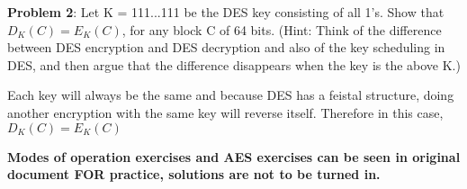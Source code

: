\documentclass[12pt,letterpaper,final]{report}
\begin{document}
\bigskip
\noindent\textbf{Problem 2}: Let K = 111...111 be the DES key consisting of all 1's.  Show that  $D_{K}(C) = E_{K}(C)$,  for any block C of 64 bits. (Hint: Think of the difference between DES encryption and DES decryption and also of the key scheduling in DES, and then argue that the difference disappears when the key is the above K.)

\bigskip Each key will always be the same and because DES has a feistal structure, doing another encryption with the same key will reverse itself. Therefore in this case, $D_{K}(C) = E_{K}(C)$

\bigskip
\indent\textbf{Modes of operation exercises and AES exercises can be seen in original document FOR practice, solutions are not to be turned in.}
\end{document}
